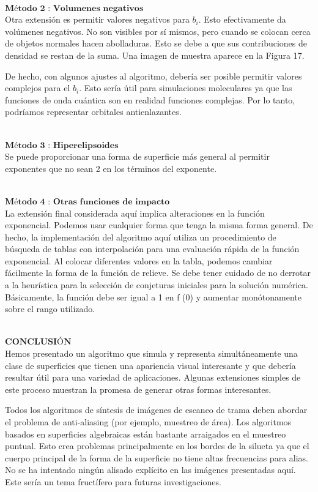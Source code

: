 ${ }$\\
$\textbf{Método 2 : Volumenes negativos}$
${ }$\\

Otra extensión es permitir valores negativos para $ b_i $. Esto efectivamente da volúmenes negativos. No son visibles por sí mismos, pero cuando se colocan cerca de objetos normales hacen abolladuras. Esto se debe a que sus contribuciones de densidad se restan de la suma. Una imagen de muestra aparece en la Figura 17.

De hecho, con algunos ajustes al algoritmo, debería ser posible permitir valores complejos para el $b_i$. Esto sería útil para simulaciones moleculares ya que las funciones de onda cuántica son en realidad funciones complejas. Por lo tanto, podríamos representar orbitales antienlazantes.

${ }$\\
$\textbf{Método 3 : Hiperelipsoides}$
${ }$\\

Se puede proporcionar una forma de superficie más general al permitir exponentes que no sean 2 en los términos del exponente.

${ }$\\
$\textbf{Método 4 : Otras funciones de impacto}$
${ }$\\

La extensión final considerada aquí implica alteraciones en la función exponencial. Podemos usar cualquier forma que tenga la misma forma general. De hecho, la implementación del algoritmo aquí utiliza un procedimiento de búsqueda de tablas con interpolación para una evaluación rápida de la función exponencial. Al colocar diferentes valores en la tabla, podemos cambiar fácilmente la forma de la función de relieve. Se debe tener cuidado de no derrotar a la heurística para la selección de conjeturas iniciales para la solución numérica. Básicamente, la función debe ser igual a 1 en f (0) y aumentar monótonamente sobre el rango utilizado.

${ }$\\
$\textbf{CONCLUSIÓN}$
${ }$\\

Hemos presentado un algoritmo que simula y representa simultáneamente una clase de superficies que tienen una apariencia visual interesante y que debería resultar útil para una variedad de aplicaciones. Algunas extensiones simples de este proceso muestran la promesa de generar otras formas interesantes.

Todos los algoritmos de síntesis de imágenes de escaneo de trama deben abordar el problema de anti-aliasing (por ejemplo, muestreo de área). Los algoritmos basados en superficies algebraicas están bastante arraigados en el muestreo puntual. Esto crea problemas principalmente en los bordes de la silueta ya que el cuerpo principal de la forma de la superficie no tiene altas frecuencias para alias. No se ha intentado ningún alisado explícito en las imágenes presentadas aquí. Este sería un tema fructífero para futuras investigaciones.